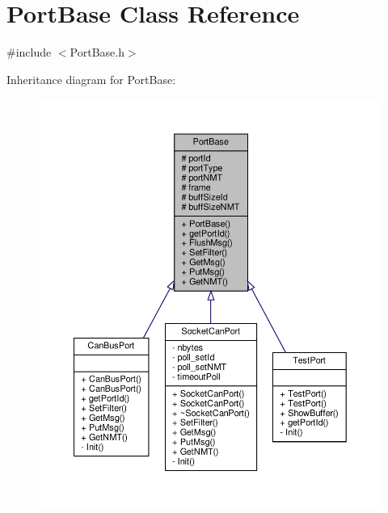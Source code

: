 \hypertarget{classPortBase}{}\section{Port\+Base Class Reference}
\label{classPortBase}


{\ttfamily \#include $<$Port\+Base.\+h$>$}



Inheritance diagram for Port\+Base\+:
\nopagebreak
\begin{figure}[H]
\begin{center}
\leavevmode
\includegraphics[width=350pt]{classPortBase__inherit__graph}
\end{center}
\end{figure}


